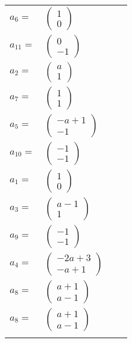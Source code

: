 \documentclass[1p]{elsarticle_modified}
\theoremstyle{definition}
\begin{document}
\begin{tabular}{m{7pt} m{180pt} m{7pt} m{180pt} }
\flushright $a_{6}=$&$\begin{pmatrix}1\\0\end{pmatrix}$ \\
\flushright $a_{11}=$&$\begin{pmatrix}0\\-1\end{pmatrix}$ \\
\flushright $a_{2}=$&$\begin{pmatrix}a\\1\end{pmatrix}$ \\
\flushright $a_{7}=$&$\begin{pmatrix}1\\1\end{pmatrix}$ \\
\flushright $a_{5}=$&$\begin{pmatrix}- a+1\\-1\end{pmatrix}$ \\
\flushright $a_{10}=$&$\begin{pmatrix}-1\\-1\end{pmatrix}$ \\
\flushright $a_{1}=$&$\begin{pmatrix}1\\0\end{pmatrix}$ \\
\flushright $a_{3}=$&$\begin{pmatrix}a-1\\1\end{pmatrix}$ \\
\flushright $a_{9}=$&$\begin{pmatrix}-1\\-1\end{pmatrix}$ \\
\flushright $a_{4}=$&$\begin{pmatrix}-2 a+3\\- a+1\end{pmatrix}$ \\
\flushright $a_{8}=$&$\begin{pmatrix}a+1\\a-1\end{pmatrix}$\\ \flushright $a_{8}=$&$\begin{pmatrix}a+1\\a-1\end{pmatrix}$\\&\end{tabular}
\end{document}
